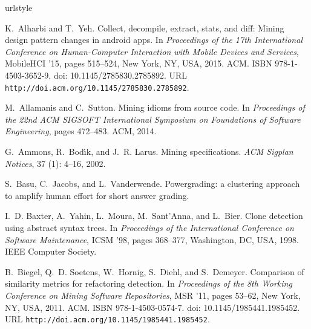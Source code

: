 \documentclass[12pt,twoside]{mitthesis}
\providecommand{\DIFaddtex}[1]{{\protect\color{blue}\uwave{#1}}} %
\providecommand{\DIFaddbegin}{} %
\providecommand{\DIFaddend}{} %
\providecommand{\DIFdelbegin}{} %
\providecommand{\DIFdelend}{} %
\providecommand{\DIFadd}[1]{\texorpdfstring{\DIFaddtex{#1}}{#1}} %
\begin{document}
\clearpage
\DIFdelbegin %
\DIFdelend \DIFaddbegin \begin{thebibliography}{135}
\DIFaddend \providecommand{\natexlab}[1]{#1}
\providecommand{\url}[1]{\texttt{#1}}
\expandafter\ifx\csname urlstyle\endcsname\relax
  \providecommand{\doi}[1]{doi: #1}\else
  \providecommand{\doi}{doi: \begingroup \urlstyle{rm}\Url}\fi

K.~Alharbi and T.~Yeh.
\newblock Collect, decompile, extract, stats, and diff: Mining design pattern
  changes in android apps.
\newblock In \emph{Proceedings of the 17th International Conference on
  Human-Computer Interaction with Mobile Devices and Services}, MobileHCI '15,
  pages 515--524, New York, NY, USA, 2015. ACM.
\newblock ISBN 978-1-4503-3652-9.
\newblock \doi{10.1145/2785830.2785892}.
\newblock URL \url{http://doi.acm.org/10.1145/2785830.2785892}.

M.~Allamanis and C.~Sutton.
\newblock Mining idioms from source code.
\newblock In \emph{Proceedings of the 22nd ACM SIGSOFT International Symposium
  on Foundations of Software Engineering}, pages 472--483. ACM, 2014.

G.~Ammons, R.~Bod{\'\i}k, and J.~R. Larus.
\newblock Mining specifications.
\newblock \emph{ACM Sigplan Notices}, 37 (1): 4--16, 2002.

\DIFdelbegin %
\DIFdelend \DIFaddbegin {}
\DIFaddend S.~Basu, C.~Jacobs, and L.~Vanderwende.
\newblock Powergrading: a clustering approach to amplify human effort for short
  answer grading.
\DIFaddbegin \newblock \emph{\DIFadd{TACL}}\DIFadd{, 1:} \DIFadd{391--402, 2013.
}\DIFaddend 

I.~D. Baxter, A.~Yahin, L.~Moura, M.~Sant'Anna, and L.~Bier.
\newblock Clone detection using abstract syntax trees.
\newblock In \emph{Proceedings of the International Conference on Software
  Maintenance}, ICSM '98, pages 368--377, Washington, DC, USA, 1998. IEEE
  Computer Society.

B.~Biegel, Q.~D. Soetens, W.~Hornig, S.~Diehl, and S.~Demeyer.
\newblock Comparison of similarity metrics for refactoring detection.
\newblock In \emph{Proceedings of the 8th Working Conference on Mining Software
  Repositories}, MSR '11, pages 53--62, New York, NY, USA, 2011. ACM.
\newblock ISBN 978-1-4503-0574-7.
\newblock \doi{10.1145/1985441.1985452}.
\newblock URL \url{http://doi.acm.org/10.1145/1985441.1985452}.


\end{thebibliography}
\end{document}
